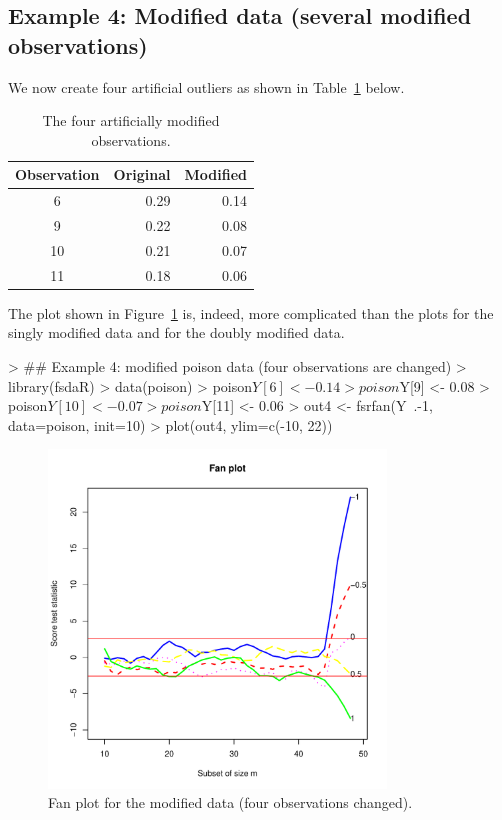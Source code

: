 \documentclass[article,shortnames,nojss]{jss}
\begin{document}
\subsection[Example 4: Modified poison data (several modified observations)]{Example 4: Modified  data (several modified observations)}

We now create four artificial outliers as shown in Table~\ref{tab:ex-4} below.

\begin{table}[ht]
\centering
\begin{tabular}{crr}
  \hline
 Observation& Original & Modified \\
  \hline
   6 & 0.29 & 0.14 \\
   9 & 0.22 & 0.08 \\
  10 & 0.21 & 0.07 \\
  11 & 0.18 & 0.06 \\
   \hline
\end{tabular}
\caption{The four artificially modified observations.}
\label{tab:ex-4}
\end{table}

The plot shown in Figure~\ref{fig:ex-4} is, indeed, more complicated than the plots for the singly modified data and for the doubly modified data.

\begin{Schunk}
\begin{Sinput}
> ##  Example 4: modified poison data (four observations are changed)
> library(fsdaR)
> data(poison)
> poison$Y[6] <- 0.14
> poison$Y[9] <- 0.08
> poison$Y[10] <- 0.07
> poison$Y[11] <- 0.06
> out4 <- fsrfan(Y~.-1, data=poison, init=10)
> plot(out4, ylim=c(-10, 22))
\end{Sinput}
\end{Schunk}

\begin{center}
\begin{figure}[H]
\includegraphics[width=0.8\textwidth]{transreg-ex-4}
\caption{Fan plot for the modified  data (four observations changed).}
\label{fig:ex-4}
\end{figure}
\end{center}
\end{document}
